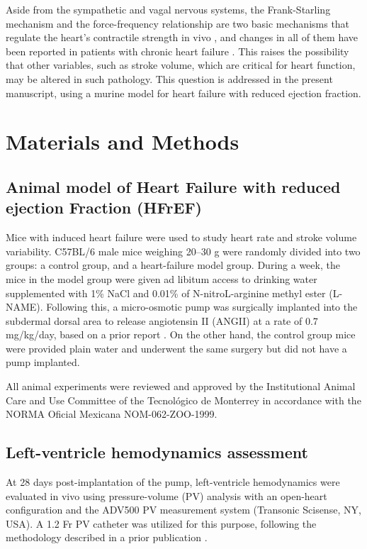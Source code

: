 \documentclass[%
preprint,
 amsmath,amssymb,
 aps,
]{revtex4-2}
\begin{document}
Aside from the sympathetic and vagal nervous systems, the Frank-Starling mechanism and the force-frequency relationship are two basic mechanisms that regulate the heart's contractile strength in vivo \citep{Holubarsch_1996} , and changes in all of them have been reported in patients with chronic heart failure \citep{Mulieri_1992, Pieske_1992, Bristow_1982, Bristow_1989, Holubarsch_1996}. This raises the possibility that other variables, such as stroke volume, which are critical for heart function, may be altered in such pathology. This question is addressed in the present manuscript, using a murine model for heart failure with reduced ejection fraction.

\section{\label{sec:meth}Materials and Methods}

\subsection{Animal model of  Heart Failure with reduced ejection Fraction  (HFrEF)}

Mice with induced heart failure were used to study heart rate and stroke volume variability. C57BL/6 male mice weighing 20–30 g were randomly divided into two groups: a control group, and a heart-failure model group. During a week, the mice in the model group were given ad libitum access to drinking water supplemented with 1\% NaCl and 0.01\% of N-nitroL-arginine methyl ester (L-NAME). Following this, a micro-osmotic pump was surgically implanted into the subdermal dorsal area to release angiotensin II (ANGII) at a rate of 0.7 mg/kg/day, based on a prior report \citep{Ruiz_Esparza_2016}. On the other hand, the control group mice were provided plain water and underwent the same surgery but  did not have a pump implanted.

All animal experiments were reviewed and approved by the Institutional Animal Care and Use Committee of the Tecnológico de Monterrey in accordance with the NORMA Oficial Mexicana NOM-062-ZOO-1999. 

\subsection{Left-ventricle hemodynamics assessment}

At 28 days post-implantation of the pump, left-ventricle hemodynamics were evaluated in vivo using pressure-volume (PV) analysis with an open-heart configuration and the ADV500 PV measurement system (Transonic Scisense, NY, USA). A 1.2 Fr PV catheter was utilized for this purpose, following the methodology described in a prior publication \citep{Pacher_2008}.
\end{document}
